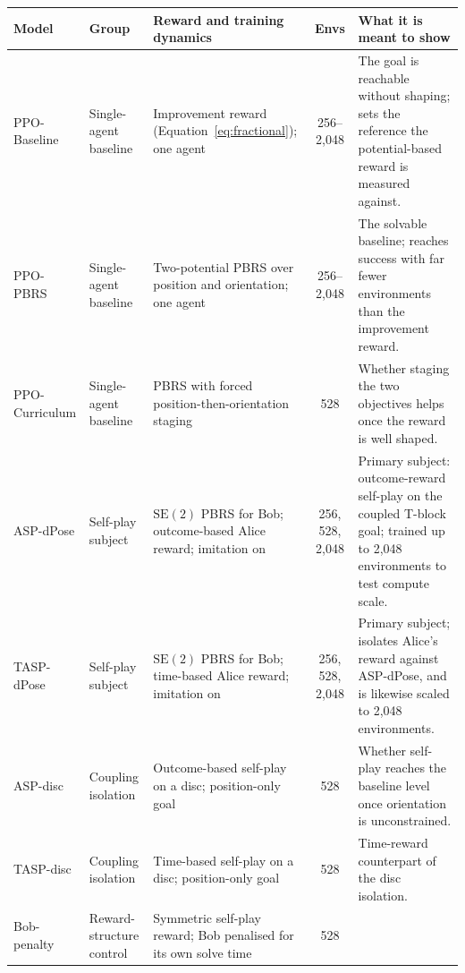 \begin{landscape}
\begin{table}[p]
    \centering
    \small
    \renewcommand{\arraystretch}{1.3}
    \begin{tabularx}{\linewidth}{@{}l p{2.4cm} >{\hsize=0.85\hsize\arraybackslash}X c >{\hsize=1.15\hsize\arraybackslash}X@{}}
        \hline
        \textbf{Model} & \textbf{Group} & \textbf{Reward and training dynamics} &
        \textbf{Envs} & \textbf{What it is meant to show} \\
        \hline
        PPO-Baseline & Single-agent baseline & Improvement reward
        (Equation~\ref{eq:fractional}); one agent & 256--2{,}048 &
        The goal is reachable without shaping; sets the reference the
        potential-based reward is measured against. \\[2pt]
        PPO-PBRS & Single-agent baseline & Two-potential PBRS over position and
        orientation; one agent & 256--2{,}048 &
        The solvable baseline; reaches success with far fewer environments than the
        improvement reward. \\[2pt]
        PPO-Curriculum & Single-agent baseline & PBRS with forced
        position-then-orientation staging & 528 &
        Whether staging the two objectives helps once the reward is well shaped. \\[2pt]
        ASP-dPose & Self-play subject & $\mathrm{SE}(2)$ PBRS for Bob;
        outcome-based Alice reward; imitation on & 256, 528, 2{,}048 &
        Primary subject: outcome-reward self-play on the coupled T-block goal;
        trained up to 2{,}048 environments to test compute scale. \\[2pt]
        TASP-dPose & Self-play subject & $\mathrm{SE}(2)$ PBRS for Bob; time-based
        Alice reward; imitation on & 256, 528, 2{,}048 &
        Primary subject; isolates Alice's reward against ASP-dPose, and is likewise
        scaled to 2{,}048 environments. \\[2pt]
        ASP-disc & Coupling isolation & Outcome-based self-play on a disc;
        position-only goal & 528 &
        Whether self-play reaches the baseline level once orientation is
        unconstrained. \\[2pt]
        TASP-disc & Coupling isolation & Time-based self-play on a disc;
        position-only goal & 528 &
        Time-reward counterpart of the disc isolation. \\[2pt]
        Bob-penalty & Reward-structure control & Symmetric self-play reward; Bob
        penalised for its own solve time & 528 &

\end{tabularx}
\end{table}
\end{landscape}
